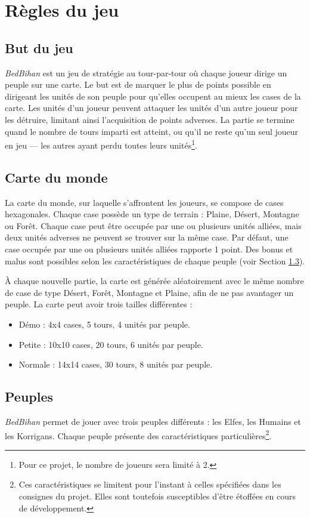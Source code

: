 \newpage
	\section{Règles du jeu}
	\label{sec:regles}

	\subsection{But du jeu}
	\label{subsec:butdujeu}
	\emph{BedBihan} est un jeu de stratégie au tour-par-tour où chaque joueur dirige un peuple sur une carte. Le but est de marquer le plus de points possible en dirigeant les unités de son peuple pour qu'elles occupent au mieux les cases de la carte. Les unités d’un joueur peuvent attaquer les unités d’un autre joueur pour les détruire, limitant ainsi l'acquisition de points adverses. La partie se termine quand le nombre de tours imparti est atteint, ou qu'il ne reste qu'un seul joueur en jeu --- les autres ayant perdu toutes leurs unités\footnote{Pour ce projet, le nombre de joueurs sera limité à 2.}.

	\subsection{Carte du monde}
	\label{subsec:carte}
	La carte du monde, sur laquelle s'affrontent les joueurs, se compose de cases hexagonales. Chaque case possède un type de terrain : Plaine,	Désert, Montagne ou Forêt. Chaque case peut être occupée par une ou plusieurs unités alliées, mais deux unités adverses ne peuvent se trouver sur la même case. Par défaut, une case occupée par une ou plusieurs unités alliées rapporte 1 point. Des bonus et malus sont possibles selon les caractéristiques de chaque peuple (voir Section \ref{subsec:peuples}). 
	
	À chaque nouvelle partie, la carte est générée aléatoirement avec le même nombre de case de type Désert, Forêt, Montagne et Plaine, afin de ne pas avantager un peuple. 
	La carte peut avoir trois tailles différentes :
	\begin{itemize}
		\item Démo : 4x4 cases, 5 tours, 4 unités par peuple.
		\item Petite : 10x10 cases, 20 tours, 6 unités par peuple.
		\item Normale : 14x14 cases, 30 tours, 8 unités par peuple.
	\end{itemize}
	
	
	\subsection{Peuples}
	\label{subsec:peuples}
	\emph{BedBihan} permet de jouer avec trois peuples différents : les Elfes, les Humains et les Korrigans. Chaque peuple présente des caractéristiques particulières\footnote{Ces caractéristiques se limitent pour l'instant à celles spécifiées dans les consignes du projet. Elles sont toutefois susceptibles d'être étoffées en cours de développement.}.
	
